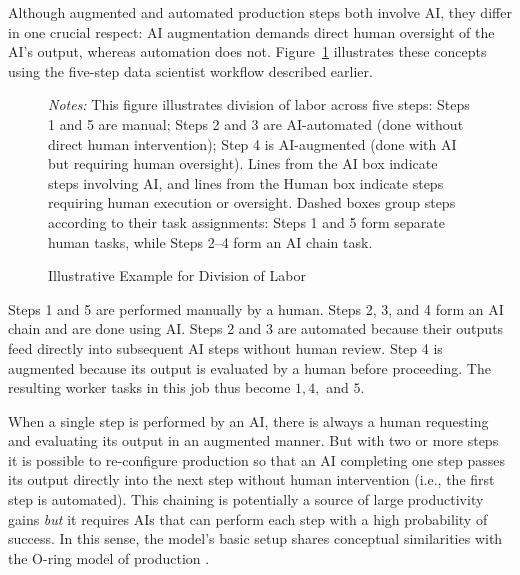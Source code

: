 Although augmented and automated production steps both involve AI, they differ in one crucial respect: AI augmentation demands direct human oversight of the AI's output, whereas automation does not.
Figure~\ref{fig:task_division} illustrates these concepts using the five-step data scientist workflow described earlier.
\begin{figure}[t!]
  \begin{center}
  \caption{Illustrative Example for Division of Labor}
  \label{fig:task_division}
  
  \end{center}
  \footnotesize{
  \emph{Notes:} This figure illustrates division of labor across five steps: Steps 1 and 5 are manual; Steps 2 and 3 are AI-automated (done without direct human intervention); Step 4 is AI-augmented (done with AI but requiring human oversight). 
  Lines from the AI box indicate steps involving AI, and lines from the Human box indicate steps requiring human execution or oversight. 
  Dashed boxes group steps according to their task assignments: Steps 1 and 5 form separate human tasks, while Steps 2–4 form an AI chain task.
  }
\end{figure}
Steps 1 and 5 are performed manually by a human.  
Steps 2, 3, and 4 form an AI chain and are done using AI.
Steps 2 and 3 are automated because their outputs feed directly into subsequent AI steps without human review.
Step 4 is augmented because its output is evaluated by a human before proceeding. 
The resulting worker tasks in this job thus become $1,4,$ and $5$.

When a single step is performed by an AI, there is always a human requesting and evaluating its output in an augmented manner.  
But with two or more steps it is possible to re-configure production so that an AI completing one step passes its output directly into the next step without human intervention (i.e., the first step is automated). 
This chaining is potentially a source of large productivity gains \emph{but} it requires AIs that can perform each step with a high probability of success.
In this sense, the model's basic setup shares conceptual similarities with the O-ring model of production \citep{kremer1993oring, gans2026oring}.

